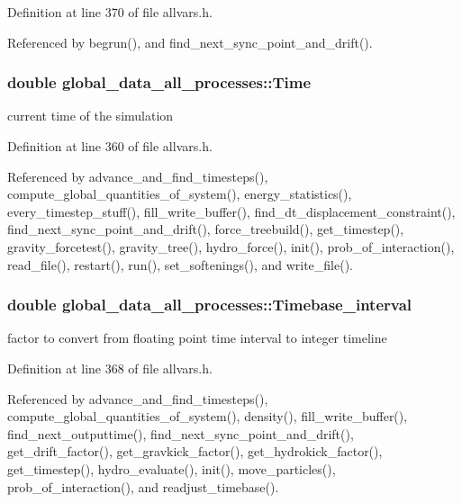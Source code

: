 Definition at line 370 of file allvars.h.



Referenced by begrun(), and find\_\-next\_\-sync\_\-point\_\-and\_\-drift().

\hypertarget{structglobal__data__all__processes_a25b9da73fdcbdc45fbe4a6ad45479f09}{
\subsubsection[{Time}]{\setlength{\rightskip}{0pt plus 5cm}double {\bf global\_\-data\_\-all\_\-processes::Time}}}
\label{structglobal__data__all__processes_a25b9da73fdcbdc45fbe4a6ad45479f09}
current time of the simulation 

Definition at line 360 of file allvars.h.



Referenced by advance\_\-and\_\-find\_\-timesteps(), compute\_\-global\_\-quantities\_\-of\_\-system(), energy\_\-statistics(), every\_\-timestep\_\-stuff(), fill\_\-write\_\-buffer(), find\_\-dt\_\-displacement\_\-constraint(), find\_\-next\_\-sync\_\-point\_\-and\_\-drift(), force\_\-treebuild(), get\_\-timestep(), gravity\_\-forcetest(), gravity\_\-tree(), hydro\_\-force(), init(), prob\_\-of\_\-interaction(), read\_\-file(), restart(), run(), set\_\-softenings(), and write\_\-file().

\hypertarget{structglobal__data__all__processes_a0dd4962a455bb955f04ec271d7af7bb4}{
\subsubsection[{Timebase\_\-interval}]{\setlength{\rightskip}{0pt plus 5cm}double {\bf global\_\-data\_\-all\_\-processes::Timebase\_\-interval}}}
\label{structglobal__data__all__processes_a0dd4962a455bb955f04ec271d7af7bb4}
factor to convert from floating point time interval to integer timeline 

Definition at line 368 of file allvars.h.



Referenced by advance\_\-and\_\-find\_\-timesteps(), compute\_\-global\_\-quantities\_\-of\_\-system(), density(), fill\_\-write\_\-buffer(), find\_\-next\_\-outputtime(), find\_\-next\_\-sync\_\-point\_\-and\_\-drift(), get\_\-drift\_\-factor(), get\_\-gravkick\_\-factor(), get\_\-hydrokick\_\-factor(), get\_\-timestep(), hydro\_\-evaluate(), init(), move\_\-particles(), prob\_\-of\_\-interaction(), and readjust\_\-timebase().

